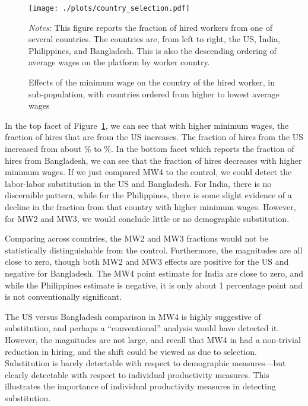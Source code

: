 \begin{figure}
\centering 
\caption{Effects of the minimum wage on the country of the hired worker, in \lpw{} sub-population, with countries ordered from higher to lowest average wages} \label{fig:country_selection} 
\texttt{[image: ./plots/country\_selection.pdf]} 
\begin{minipage}{0.95\linewidth}
{\footnotesize
\emph{Notes:} This figure reports the fraction of hired workers from one of several countries.
The countries are, from left to right, the US, India, Philippines, and Bangladesh.
This is also the descending ordering of average wages on the platform by worker country. 
}
\end{minipage} 
\end{figure} 
\FloatBarrier


In the top facet of Figure~\ref{fig:country_selection}, we can see that with higher minimum wages, the fraction of hires that are from the US increases.
The fraction of hires from the US increased from about \USfractionControl{}\% to  \USfractionFour{}\%.
In the bottom facet which reports the fraction of hires from Bangladesh, we can see that the fraction of hires decreases with higher minimum wages.
If we just compared MW4 to the control, we could detect the labor-labor substitution in the US and Bangladesh.
For India, there is no discernible pattern, while for the Philippines, there is some slight evidence of a decline in the fraction from that country with higher minimum wages. 
However, for MW2 and MW3, we would conclude little or no demographic substitution. 

Comparing across countries, the MW2 and MW3 fractions would not be statistically distinguishable from the control.
Furthermore, the magnitudes are all close to zero, though both MW2 and MW3 effects are positive for the US and negative for Bangladesh.
The MW4 point estimate for India are close to zero, and while the Philippines estimate is negative, it is only about 1 percentage point and is not conventionally significant.

The US versus Bangladesh comparison in MW4 is highly suggestive of substitution, and perhaps a ``conventional'' analysis would have detected it.
However, the magnitudes are not large, and recall that MW4 in \lpw{} had a non-trivial reduction in hiring, and the shift could be viewed as due to selection. 
Substitution is barely detectable with respect to demographic measures---but clearly detectable with respect to individual productivity measures.
This illustrates the importance of individual productivity measures in detecting substitution. 


